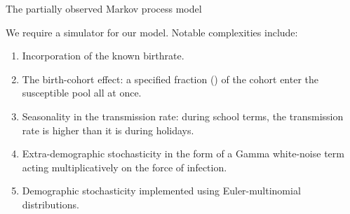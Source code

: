 \begin{frame}{The partially observed Markov process model}

  We require a simulator for our model.
  Notable complexities include:
  \begin{enumerate}
  \item Incorporation of the known birthrate.
  \item The birth-cohort effect: a specified fraction () of the cohort enter the susceptible pool all at once.
  \item Seasonality in the transmission rate: during school terms, the transmission rate is higher than it is during holidays.
  \item Extra-demographic stochasticity in the form of a Gamma white-noise term acting multiplicatively on the force of infection.
  \item Demographic stochasticity implemented using Euler-multinomial distributions.
  \end{enumerate}
\end{frame}



